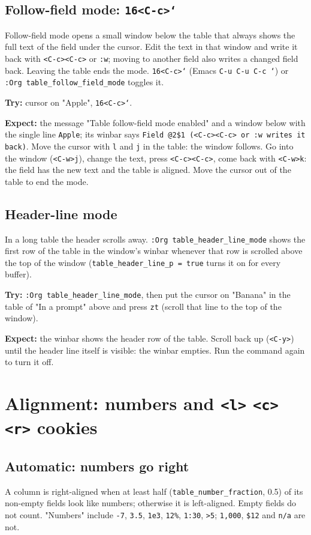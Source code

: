\subsection{Follow-field mode: \texttt{16<C-c>`}}
\label{sec:org6edcd02}
Follow-field mode opens a small window below the table that always shows
the full text of the field under the cursor. Edit the text in that window
and write it back with \texttt{<C-c><C-c>} or \texttt{:w}; moving to another field also
writes a changed field back. Leaving the table ends the mode. \texttt{16<C-c>`}
(Emacs \texttt{C-u C-u C-c `}) or \texttt{:Org table\_follow\_field\_mode} toggles it.

\textbf{Try:} cursor on "Apple", \texttt{16<C-c>`}.

\textbf{Expect:} the message "Table follow-field mode enabled" and a window below
with the single line \texttt{Apple}; its winbar says
\texttt{Field @2\$1  (<C-c><C-c> or :w writes it back)}. Move the cursor with \texttt{l}
and \texttt{j} in the table: the window follows. Go into the window (\texttt{<C-w>j}),
change the text, press \texttt{<C-c><C-c>}, come back with \texttt{<C-w>k}: the field
has the new text and the table is aligned. Move the cursor out of the table
to end the mode.
\subsection{Header-line mode}
\label{sec:orgd462ce2}
In a long table the header scrolls away. \texttt{:Org table\_header\_line\_mode}
shows the first row of the table in the window's winbar whenever that row
is scrolled above the top of the window (\texttt{table\_header\_line\_p = true} turns
it on for every buffer).

\textbf{Try:} \texttt{:Org table\_header\_line\_mode}, then put the cursor on "Banana" in
the table of "In a prompt" above and press \texttt{zt} (scroll that line to the
top of the window).

\textbf{Expect:} the winbar shows the header row of the table. Scroll back up
(\texttt{<C-y>}) until the header line itself is visible: the winbar empties. Run
the command again to turn it off.
\section{Alignment: numbers and \texttt{<l>} \texttt{<c>} \texttt{<r>} cookies}
\label{sec:org90ce335}
\subsection{Automatic: numbers go right}
\label{sec:org8db22cf}
A column is right-aligned when at least half (\texttt{table\_number\_fraction},
0.5) of its non-empty fields look like numbers; otherwise it is
left-aligned. Empty fields do not count. "Numbers" include \texttt{-7}, \texttt{3.5},
\texttt{1e3}, \texttt{12\%}, \texttt{1:30}, \texttt{>5}; \texttt{1,000}, \texttt{\$12} and \texttt{n/a} are not.

